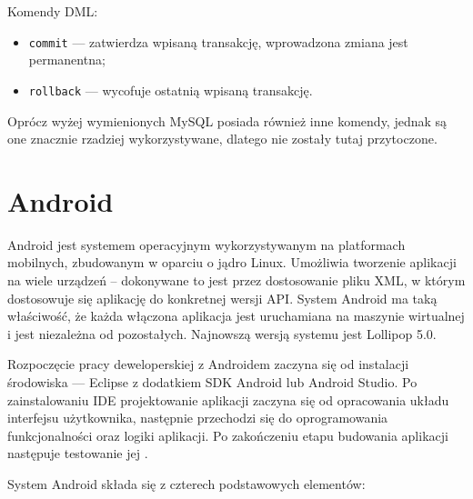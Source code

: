 \documentclass[eng,printmode,oneside]{mgr}
\begin{document}
Komendy DML:
\begin{itemize}
  \item \texttt{commit} --- zatwierdza wpisaną transakcję, wprowadzona zmiana jest
  permanentna;
  \item \texttt{rollback} --- wycofuje ostatnią wpisaną transakcję.
\end{itemize}

Oprócz wyżej wymienionych MySQL posiada również inne komendy, jednak są one
znacznie rzadziej wykorzystywane, dlatego nie zostały tutaj przytoczone.

\newpage
\section{Android}

Android jest systemem operacyjnym wykorzystywanym na platformach mobilnych,
zbudowanym w oparciu o jądro Linux. Umożliwia tworzenie aplikacji na wiele
urządzeń -- dokonywane to jest przez dostosowanie pliku XML, w którym
dostosowuje się aplikację do konkretnej wersji API. System Android ma taką
właściwość, że każda włączona aplikacja jest uruchamiana na maszynie
wirtualnej i jest niezależna od pozostałych. Najnowszą wersją systemu
jest Lollipop 5.0.

Rozpoczęcie pracy deweloperskiej z Androidem zaczyna się od instalacji
środowiska --- Eclipse z dodatkiem SDK Android lub Android Studio. Po
zainstalowaniu IDE projektowanie aplikacji zaczyna się od opracowania układu
interfejsu użytkownika, następnie przechodzi się do oprogramowania
funkcjonalności oraz logiki aplikacji. Po zakończeniu etapu budowania aplikacji
następuje testowanie jej \cite{developer.android}.

System Android składa się z czterech podstawowych elementów:
\end{document}
